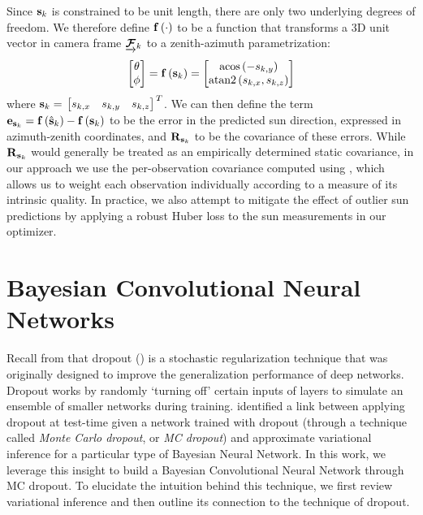Since $\boldsymbol{\mathbf{s}}_k$ is constrained to be unit length, there are only two underlying degrees of freedom.
We therefore define $\boldsymbol{\mathbf{f}}\left(\cdot\right)$ to be a function that transforms a 3D unit vector in camera frame $\underrightarrow{ \boldsymbol{\mathbf{\mathcal{F}}} }_{k}$ to a zenith-azimuth parametrization:
\begin{equation} \label{eq:vec-to-az-zen}
	\begin{bmatrix} \theta \\ \phi \end{bmatrix}
    = \boldsymbol{\mathbf{f}} \left( \boldsymbol{\mathbf{s}}_k \right)
    = \begin{bmatrix} \text{acos}\left( -s_{k,y} \right) \\ \text{atan2}\left(s_{k,x}, s_{k,z} \right) \end{bmatrix}
\end{equation}
where $\boldsymbol{\mathbf{s}}_k = \left.{\begin{bmatrix} s_{k,x} & s_{k,y} & s_{k,z} \end{bmatrix}}\right.^T$.
We can then define the term $\boldsymbol{\mathbf{e}}_{\boldsymbol{\mathbf{s}}_k} = \boldsymbol{\mathbf{f}}\left(\hat{\boldsymbol{\mathbf{s}}}_k\right) - \boldsymbol{\mathbf{f}}\left(\boldsymbol{\mathbf{s}}_k\right)$ to be the error in the predicted sun direction, expressed in azimuth-zenith coordinates, and $\boldsymbol{\mathbf{R}}_{\boldsymbol{\mathbf{s}}_k}$ to be the covariance of these errors.
While $\boldsymbol{\mathbf{R}}_{\boldsymbol{\mathbf{s}}_k}$ would generally be treated as an empirically determined static covariance, in our approach we use the per-observation covariance computed using , which allows us to weight each observation individually according to a measure of its intrinsic quality.
In practice, we also attempt to mitigate the effect of outlier sun predictions by applying a robust Huber loss to the sun measurements in our optimizer.


\section{Bayesian Convolutional Neural Networks}

Recall from  that dropout () is a stochastic regularization technique that was originally designed to improve the generalization performance of deep networks. Dropout works by randomly `turning off' certain inputs of layers to simulate an ensemble of smaller networks during training. \cite{Gal2016CNN} identified a link between applying dropout at test-time given a network trained with dropout (through a technique called \textit{Monte Carlo dropout}, or \textit{MC dropout}) and approximate variational inference for a particular type of Bayesian Neural Network. In this work, we leverage this insight to build a Bayesian Convolutional Neural Network through MC dropout. To elucidate the intuition behind this technique, we first review variational inference and then outline its connection to the technique of dropout. 



